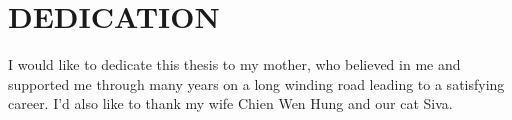 \chapter*{DEDICATION}

I would like to dedicate this thesis to my mother, who believed in me and supported me through many years on a long winding road leading to a satisfying career.  I'd also like to thank my wife Chien Wen Hung and our cat Siva.
